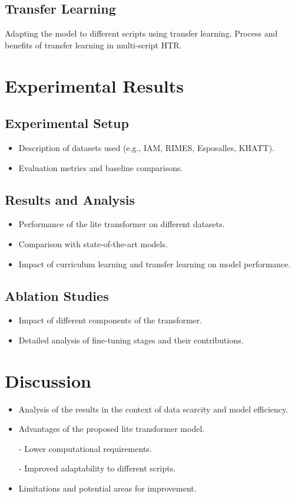 \documentclass{article}
\begin{document}
\subsection{Transfer Learning}
Adapting the model to different scripts using transfer learning.
Process and benefits of transfer learning in multi-script HTR.

\section{Experimental Results}
\subsection{Experimental Setup}
    \begin{itemize}
        \item Description of datasets used (e.g., IAM, RIMES, Esposalles, KHATT).
        \item Evaluation metrics and baseline comparisons. 
    \end{itemize}
    
\subsection{Results and Analysis}
    \begin{itemize}
        \item Performance of the lite transformer on different datasets.
        \item Comparison with state-of-the-art models.
        \item Impact of curriculum learning and transfer learning on model performance.
    \end{itemize}
    
\subsection{Ablation Studies}
    \begin{itemize}
        \item Impact of different components of the transformer.
        \item Detailed analysis of fine-tuning stages and their contributions.
    \end{itemize}

\section{Discussion}
    \begin{itemize}
        \item Analysis of the results in the context of data scarcity and model efficiency.
        \item Advantages of the proposed lite transformer model.
            \item[-] Lower computational requirements.
            \item[-] Improved adaptability to different scripts.
        \item Limitations and potential areas for improvement.
   
    \end{itemize}
\end{document}
